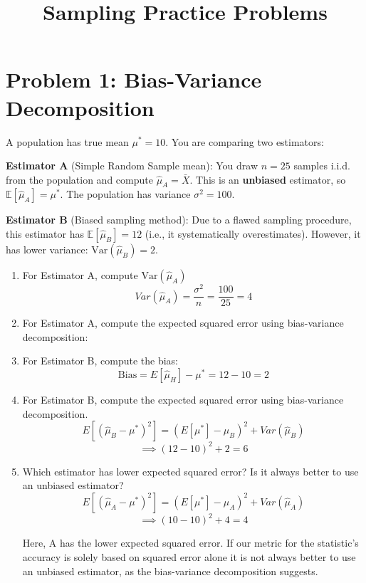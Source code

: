 \documentclass{article}
\title{Sampling Practice Problems}
\author{}
\date{}
\begin{document}
\maketitle

\section*{Problem 1: Bias-Variance Decomposition}

A population has true mean $\mu^* = 10$. You are comparing two estimators:

\textbf{Estimator A} (Simple Random Sample mean): You draw $n = 25$ samples i.i.d. from the population and compute $\hat{\mu}_A = \bar{X}$. This is an \textbf{unbiased} estimator, so $\mathbb{E}[\hat{\mu}_A] = \mu^*$. The population has variance $\sigma^2 = 100$.

\textbf{Estimator B} (Biased sampling method): Due to a flawed sampling procedure, this estimator has $\mathbb{E}[\hat{\mu}_B] = 12$ (i.e., it systematically overestimates). However, it has lower variance: $\text{Var}(\hat{\mu}_B) = 2$.

\begin{enumerate}[label=(\alph*)]
    \item For Estimator A, compute $\text{Var}(\hat{\mu}_A)$
    \[
        Var(\hat{\mu}_A) = \frac{\sigma^2}{n} = \frac{100}{25} = 4
    \]
    \item For Estimator A, compute the expected squared error using bias-variance decomposition:

    \item For Estimator B, compute the bias:
    \[
        \text{Bias} = E[\hat{\mu}_H] - \mu^* = 12 - 10 = 2
    \]

    \item For Estimator B, compute the expected squared error using bias-variance decomposition.
    \[
        E[(\hat{\mu}_B - \mu^*)^2] = (E[\mu^*] - \mu_B)^2 + Var(\hat{\mu}_B)
    \]
    \[
        \implies (12 - 10)^2 + 2 = 6
    \]
    
    \item Which estimator has lower expected squared error? Is it always better to use an unbiased estimator?
    \[
        E[(\hat{\mu}_A - \mu^*)^2] = (E[\mu^*] - \mu_A)^2 + Var(\hat{\mu}_A)
    \]
    \[
        \implies (10 - 10)^2 + 4 = 4
    \]

    Here, A has the lower expected squared error. If our metric for the statistic's accuracy is solely based on squared error alone it is not always better to use an unbiased estimator, as the bias-variance decomposition suggests.
\end{enumerate}
\end{document}
